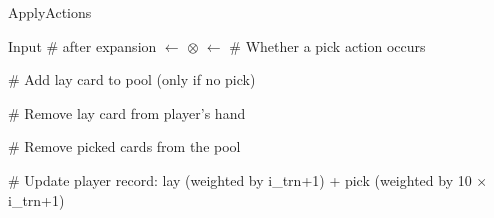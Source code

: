 \begin{algorithm}
\caption{ApplyActions}
\label{alg:applyactions}
\begin{algorithmic}[1]
\State Input 
\Statex \textcolor{green!50!black}{\scriptsize \#  after expansion  $\gets$  $\otimes$ }
\State {} $\gets$ 
\Statex \textcolor{green!50!black}{\scriptsize \# Whether a pick action occurs}

\State {}
\Statex \textcolor{green!50!black}{\scriptsize \# Add lay card to pool (only if no pick)}

\State {}
\Statex \textcolor{green!50!black}{\scriptsize \# Remove lay card from player's hand}

\State {}
\Statex \textcolor{green!50!black}{\scriptsize \# Remove picked cards from the pool}

\State {}
\Statex \textcolor{green!50!black}{\scriptsize \# Update player record: lay (weighted by i\_trn+1) + pick (weighted by 10 × i\_trn+1)}
\end{algorithmic}
\end{algorithm}